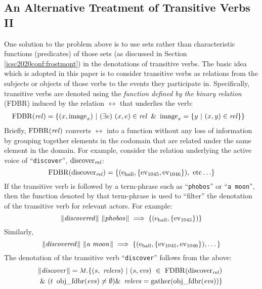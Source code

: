 \documentclass[../main.tex]{subfiles}
\begin{document}
\begin{refsection}
\subsection{An Alternative Treatment of Transitive Verbs II}
\label{icsc2020conf:altvbii}


One solution to the problem above is to use sets rather than characteristic functions (predicates) of those sets (as discussed in Section \ref{icsc2020conf:frostmont}) in the denotations of transitive verbs. The basic idea \cite{frost1989constructing} which is adopted in this paper is to consider transitive verbs as relations from the subjects or objects of those verbs to the events they participate in.
Specifically, transitive verbs are denoted using the {\em function defined by the binary relation} (FDBR) \cite{peelar2016accommodating} induced by the relation $\rel$ that underlies the verb:
\begin{equation*}
	\begin{split}
		&\operatorname{FDBR}({\operatorname{\mathit{rel}}}) = \{(x, \operatorname{image}_x)\ | \ (\exists e)\ (x, e) \in \operatorname{\mathit{rel}}\ \& \ \operatorname{image}_x = \{ y\ |\ (x, y) \in \operatorname{\mathit{rel}} \}  \}
	\end{split}
\end{equation*}
Briefly, $\operatorname{FDBR}({\operatorname{\mathit{rel}}})$ converts $\rel$ into a function without any loss of information by grouping together elements in the codomain that are related under the same element in the domain. For example, consider the relation underlying the active voice of ``\texttt{discover}'', $\operatorname{discover}_{\operatorname{\mathit{rel}}}$:
\[ \FDBR{\relation{discover}} = \{(\entityassoc{\hall}, \{ \eventassoc{1045}, \eventassoc{1046} \} ),\ \dmathrm{etc} \ldots \} \]
If the transitive verb is followed by a term-phrase such as ``\texttt{phobos}'' or ``\texttt{a moon}'', then
the function denoted by that term-phrase is used to ``filter'' the denotation of the transitive verb for relevant actors. For example:
\[ \lVert\textit{discovered\hspace{0.1em}}\rVert \ \lVert\textit{phobos\hspace{0.1em}}\rVert \implies \{ (\mathrm{e}_{\operatorname{\operatorname{hall}}}, \{ \operatorname{ev}_{1045} \} ) \} \]
Similarly,
\[\meaningof{discovered} \ \meaningof{a\ moon} \implies \{ (\entityassoc{\hall}, \{ \eventassoc{1045}, \eventassoc{1046} \} ), \dots \} \]
\noindent The denotation of the transitive verb ``\texttt{discover}'' follows from the above:
\begin{multline*}
	\meaningof{discover} =
	\lambda t.\{ (s,\ \opit{relevs})\ |\ (s, \evs)\ \in\ \FDBR{\relation{discover}}\  \\
	\&\ (t\ \objfdbr{\evs} \neq \emptyset)
	\&\ \opit{relevs} = \gatherevs{\objfdbr{\evs}} \}

\end{multline*}
\end{refsection}
\end{document}
